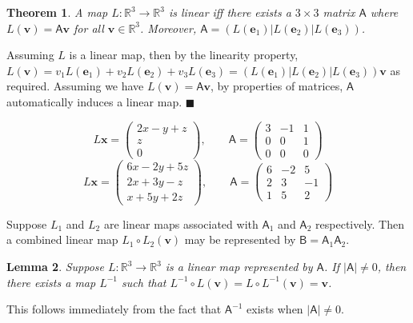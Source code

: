 \documentclass[letter-paper]{tufte-book}
\newtheorem{theorem}{\color{pastel-blue}Theorem}[section]
\newtheorem{lemma}[theorem]{\color{pastel-blue}Lemma}
\newenvironment{proof}[1][Proof]{\begin{trivlist}
\item[\hskip \labelsep {\bfseries #1}]}{\end{trivlist}}
\newenvironment{example}[1][Example]{\begin{trivlist}
\item[\hskip \labelsep {\bfseries #1}]}{\end{trivlist}}
\newcommand{\eb}{\boldsymbol{e}}
\newcommand{\vb}{\boldsymbol{v}}
\newcommand{\xb}{\boldsymbol{x}}
\newcommand{\qed}{\hfill$\blacksquare$}
\begin{document}
\begin{theorem}
	A map $L:\mathbb{R}^3\rightarrow\mathbb{R}^3$ is linear iff there exists a
	$3\times3$ matrix $\mathsf{A}$ where $L(\vb)=\mathsf{A}\vb$ for all
	$\vb\in\mathbb{R}^3$. Moreover, $\mathsf{A}=(L(\eb_1)|L(\eb_2)|L(\eb_3))$.
\end{theorem}
\begin{proof}
	Assuming $L$ is a linear map, then by the linearity property, $L(\vb)=v_1
	L(\eb_1)+ v_2 L(\eb_2) + v_3 L(\eb_3) = (L(\eb_1)|L(\eb_2)|L(\eb_3))\vb$ as
	required. Assuming we have $L(\vb)=\mathsf{A}\vb$, by properties of
	matrices, $\mathsf{A}$ automatically induces a linear map. \qed
\end{proof}
\begin{example}
	\begin{equation*}
		L\xb=\begin{pmatrix}2x-y+z\\ z\\ 0\end{pmatrix},\qquad
		\mathsf{A}=\begin{pmatrix}3&-1&1\\0&0&1\\0&0&0\end{pmatrix}
	\end{equation*}
	\begin{equation*}
		L\xb=\begin{pmatrix}6x-2y+5z\\2x+3y-z\\x+5y+2z\end{pmatrix},\qquad
		\mathsf{A}=\begin{pmatrix}6&-2&5\\2&3&-1\\1&5&2\end{pmatrix}
	\end{equation*}
\end{example}

Suppose $L_1$ and $L_2$ are linear maps associated with $\mathsf{A}_1$ and
$\mathsf{A}_2$ respectively. Then a combined linear map $L_1\circ L_2(\vb)$ may
be represented by $\mathsf{B}=\mathsf{A}_1 \mathsf{A}_2$.
\begin{lemma}
	Suppose $L:\mathbb{R}^3\rightarrow\mathbb{R}^3$ is a linear map represented
	by $\mathsf{A}$. If $|\mathsf{A}|\neq0$, then there exists a map $L^{-1}$
	such that $L^{-1}\circ L(\vb)=L\circ L^{-1}(\vb)=\vb$.
\end{lemma}
\begin{proof}
	This follows immediately from the fact that $\mathsf{A}^{-1}$ exists when
	$|\mathsf{A}|\neq0$.
\end{proof}
\end{document}
